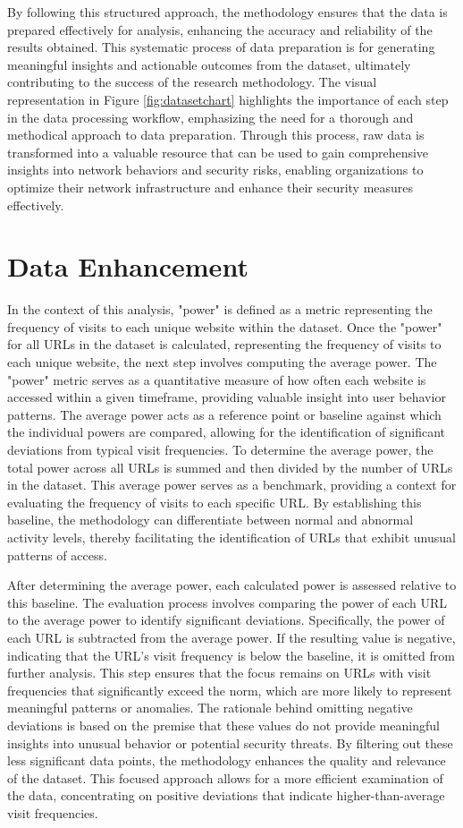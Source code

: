 By following this structured approach, the methodology ensures that the data is prepared effectively for analysis, enhancing the accuracy and reliability of the results obtained. This systematic process of data preparation is for generating meaningful insights and actionable outcomes from the dataset, ultimately contributing to the success of the research methodology. The visual representation in Figure \ref{fig:datasetchart} highlights the importance of each step in the data processing workflow, emphasizing the need for a thorough and methodical approach to data preparation. Through this process, raw data is transformed into a valuable resource that can be used to gain comprehensive insights into network behaviors and security risks, enabling organizations to optimize their network infrastructure and enhance their security measures effectively.

\section{Data Enhancement}
In the context of this analysis, "power" is defined as a metric representing the frequency of visits to each unique website within the dataset. Once the "power" for all URLs in the dataset is calculated, representing the frequency of visits to each unique website, the next step involves computing the average power. The "power" metric serves as a quantitative measure of how often each website is accessed within a given timeframe, providing valuable insight into user behavior patterns. The average power acts as a reference point or baseline against which the individual powers are compared, allowing for the identification of significant deviations from typical visit frequencies. To determine the average power, the total power across all URLs is summed and then divided by the number of URLs in the dataset. This average power serves as a benchmark, providing a context for evaluating the frequency of visits to each specific URL. By establishing this baseline, the methodology can differentiate between normal and abnormal activity levels, thereby facilitating the identification of URLs that exhibit unusual patterns of access. 

After determining the average power, each calculated power is assessed relative to this baseline. The evaluation process involves comparing the power of each URL to the average power to identify significant deviations. Specifically, the power of each URL is subtracted from the average power. If the resulting value is negative, indicating that the URL's visit frequency is below the baseline, it is omitted from further analysis. This step ensures that the focus remains on URLs with visit frequencies that significantly exceed the norm, which are more likely to represent meaningful patterns or anomalies. The rationale behind omitting negative deviations is based on the premise that these values do not provide meaningful insights into unusual behavior or potential security threats. By filtering out these less significant data points, the methodology enhances the quality and relevance of the dataset. This focused approach allows for a more efficient examination of the data, concentrating on positive deviations that indicate higher-than-average visit frequencies. 

